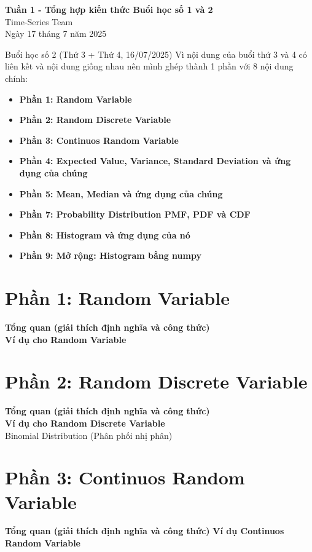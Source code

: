 \documentclass[11pt]{article}
\renewcommand{\maketitle}{%
    \begin{center}
        \fontsize{18}{20}\selectfont\textbf{Tuần 1 - Tổng hợp kiến thức Buổi học số 1 và 2}\\[1em]
        \fontsize{14}{16}\selectfont Time-Series Team\\[0.5em]
        \fontsize{14}{16}\selectfont Ngày 17 tháng 7 năm 2025
    \end{center}
    \vspace{1.5em} %
}
\begin{document}
\maketitle %

\begin{summarybox}
    Buổi học số 2 (Thứ 3 + Thứ 4, 16/07/2025) Vì nội dung của buổi thứ 3 và 4 có liên kết và nội dung giống nhau nên mình ghép thành 1 phần với 8 nội dung chính:
    \begin{itemize}
        \item \textbf{Phần 1: Random Variable}
        \item \textbf{Phần 2: Random Discrete Variable}
        \item \textbf{Phần 3: Continuos Random Variable}
		\item \textbf{Phần 4: Expected Value, Variance, Standard Deviation và ứng dụng của chúng}
        \item \textbf{Phần 5: Mean, Median và ứng dụng của chúng}
        \item \textbf{Phần 7: Probability Distribution PMF, PDF và CDF}
        \item \textbf{Phần 8: Histogram và ứng dụng của nó}
        \item \textbf{Phần 9: Mở rộng: Histogram bằng numpy}
    \end{itemize}
\end{summarybox}

\newpage
\section{Phần 1: Random Variable}
\textbf{Tổng quan (giải thích định nghĩa và công thức)} \\
\textbf{Ví dụ cho Random Variable}

\section{Phần 2: Random Discrete Variable}
\textbf{Tổng quan (giải thích định nghĩa và công thức)} \\
\textbf{Ví dụ cho Random Discrete Variable} \\

Binomial Distribution (Phân phối nhị phân)


\section{Phần 3: Continuos Random Variable}
\textbf{Tổng quan (giải thích định nghĩa và công thức)}
\textbf{Ví dụ Continuos Random Variable}
\end{document}
